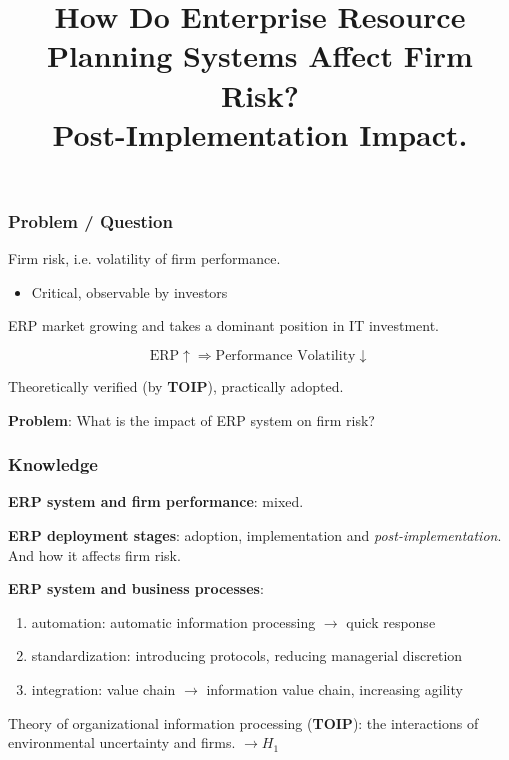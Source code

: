 \documentclass{../presentation}
\title{How Do Enterprise Resource Planning Systems Affect Firm Risk? \\ Post-Implementation Impact.}
\begin{document}
    \maketitle


    \begin{frame}
        \frametitle{Problem / Question}

        Firm risk, i.e. volatility of firm performance.

        \begin{itemize}
            \item Critical, observable by investors
        \end{itemize}

        ERP market growing and takes a dominant position in IT investment.

        \begin{equation*}
            \text{ERP}\uparrow \Longrightarrow \text{Performance Volatility}\downarrow
        \end{equation*}

        Theoretically verified (by \textbf{TOIP}), practically adopted.

        \textbf{Problem}: What is the impact of ERP system on firm risk?

    \end{frame}

    \begin{frame}
        \frametitle{Knowledge}

        \textbf{ERP system and firm performance}: mixed.

        \textbf{ERP deployment stages}: adoption, implementation and \textit{post-implementation}. And how it affects firm risk.

        \textbf{ERP system and business processes}:

        \begin{enumerate}
            \item automation: automatic information processing $\rightarrow$ quick response
            \item standardization: introducing protocols, reducing managerial discretion
            \item integration: value chain $\rightarrow$ information value chain, increasing agility
        \end{enumerate}

        Theory of organizational information processing (\textbf{TOIP}): the interactions of environmental uncertainty and firms. $\rightarrow H_1$

    \end{frame}
\end{document}

